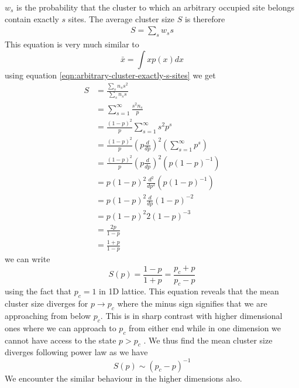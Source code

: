 		$w_s$ is the probability that the cluster to which an arbitrary occupied site belongs contain exactly $s$ sites. The average cluster size $S$ is therefore
		\begin{eqnarray}
			S = \sum_{s} w_s s
		\end{eqnarray}
		This equation is very much similar to
		\begin{equation}
			\bar{x} = \int x p(x) dx
		\end{equation}
		using equation \ref{eqn:arbitrary-cluster-exactly-s-sites} we get
		\begin{align}
			S 
			&= \frac{\sum_{s} n_s s^2}{\sum_{s} n_s s} \nonumber \\
			&= \sum_{s=1}^{\infty} \frac{s^2 n_s}{p} \nonumber\\
			&= \frac{(1-p)^2}{p} \sum_{s=1}^{\infty} s^2 p^s \nonumber \\
			&= \frac{(1-p)^2}{p} \left(p \frac{d}{dp}\right)^2 \left(\sum_{s=1}^{\infty} p^s\right) \nonumber \\
			&= \frac{(1-p)^2}{p} \left(p \frac{d}{dp}\right)^2 (p(1-p)^{-1}) \nonumber \\
			&= p(1-p)^2 \frac{d^2}{dp^2} (p(1-p)^{-1}) \nonumber \\
			&= p(1-p)^2 \frac{d}{dp}(1-p)^{-2} \nonumber \\
			&= p(1-p)^2 2 (1-p)^{-3} \nonumber \\
			&= \frac{2p}{1-p} \nonumber \\
			&= \frac{1 + p}{1 - p}
		\end{align}
		we can write
		\begin{equation}
			S(p) = \frac{1-p}{1 + p} = \frac{p_c + p}{p_c - p}
		\end{equation}
		using the fact that $p_c = 1$ in 1D lattice.
		This equation reveals that the mean cluster size diverges for $p\rightarrow p_c$ where the minus	sign signifies that we are approaching from below $p_c$. This is in sharp contrast with	higher dimensional ones where we can approach to $p_c$ from either end while in one	dimension we cannot have access to the state $p > p_c$ . We thus find the mean cluster	size diverges following power law as we have \cite{nesm-lecture-notes}
		\begin{equation}
			S(p) \sim (p_c - p)^{-1}
		\end{equation}
		We encounter the similar behaviour in the higher dimensions also.
		
